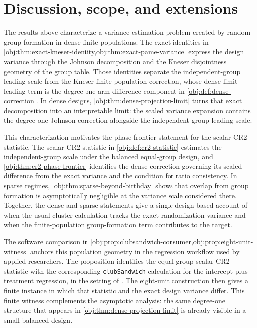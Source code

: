 \section{Discussion, scope, and extensions}\label{sec:discussion}

The results above characterize a variance-estimation problem created by random group formation in dense finite populations. The exact identities in \cref{obj:thm:exact-kneser-identity,obj:thm:exact-pame-variance} express the design variance through the Johnson decomposition and the Kneser disjointness geometry of the group table. Those identities separate the independent-group leading scale from the Kneser finite-population correction, whose dense-limit leading term is the degree-one arm-difference component in \cref{obj:def:dense-correction}. In dense designs, \cref{obj:thm:dense-projection-limit} turns that exact decomposition into an interpretable limit: the scaled variance expansion contains the degree-one Johnson correction alongside the independent-group leading scale.

This characterization motivates the phase-frontier statement for the scalar CR2 statistic. The scalar CR2 statistic in \cref{obj:def:cr2-statistic} estimates the independent-group scale under the balanced equal-group design, and \cref{obj:thm:cr2-phase-frontier} identifies the dense correction governing its scaled difference from the exact variance and the condition for ratio consistency. In sparse regimes, \cref{obj:thm:sparse-beyond-birthday} shows that overlap from group formation is asymptotically negligible at the variance scale considered there. Together, the dense and sparse statements give a single design-based account of when the usual cluster calculation tracks the exact randomization variance and when the finite-population group-formation term contributes to the target.

The software comparison in \cref{obj:prop:clubsandwich-consumer,obj:prop:eight-unit-witness} anchors this population geometry in the regression workflow used by applied researchers. The proposition identifies the equal-group scalar CR2 statistic with the corresponding \texttt{clubSandwich} calculation for the intercept-plus-treatment regression, in the setting of \citet{PustejovskyTipton2018}. The eight-unit construction then gives a finite instance in which that statistic and the exact design variance differ. This finite witness complements the asymptotic analysis: the same degree-one structure that appears in \cref{obj:thm:dense-projection-limit} is already visible in a small balanced design.

